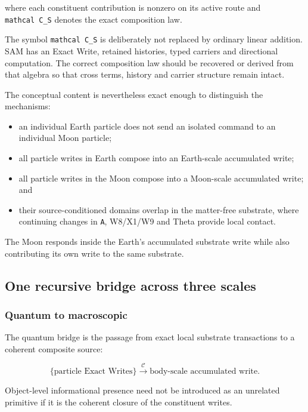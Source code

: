 where each constituent contribution is nonzero on its active route and
\texttt{mathcal\ C\_S} denotes the exact composition law.

The symbol \texttt{mathcal\ C\_S} is deliberately not replaced by
ordinary linear addition. SAM has an Exact Write, retained histories,
typed carriers and directional computation. The correct composition law
should be recovered or derived from that algebra so that cross terms,
history and carrier structure remain intact.

The conceptual content is nevertheless exact enough to distinguish the
mechanisms:

\begin{itemize}
\tightlist
\item
  an individual Earth particle does not send an isolated command to an
  individual Moon particle;
\item
  all particle writes in Earth compose into an Earth-scale accumulated
  write;
\item
  all particle writes in the Moon compose into a Moon-scale accumulated
  write; and
\item
  their source-conditioned domains overlap in the matter-free substrate,
  where continuing changes in \texttt{A}, W8/X1/W9 and Theta provide
  local contact.
\end{itemize}

The Moon responds inside the Earth's accumulated substrate write while
also contributing its own write to the same substrate.

\subsection{One recursive bridge across three
scales}\label{viii-ch12-one-recursive-bridge-across-three-scales}

\subsubsection{Quantum to macroscopic}\label{viii-ch12-quantum-to-macroscopic}

The quantum bridge is the passage from exact local substrate
transactions to a coherent composite source:

\[
\{\text{particle Exact Writes}\}
\xrightarrow{\mathcal C}
\text{body-scale accumulated write}.
\]

Object-level informational presence need not be introduced as an
unrelated primitive if it is the coherent closure of the constituent
writes.

